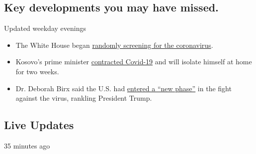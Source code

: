 \hypertarget{key-developments-you-may-have-missed}{%
\subsection{Key developments you may have
missed.}\label{key-developments-you-may-have-missed}}

Updated weekday evenings

\begin{itemize}
\tightlist
\item
  The White House began
  \href{https://www.nytimes.com/2020/08/03/world/coronavirus-covid-19.html\#link-c4a1d71}{randomly
  screening for the coronavirus}.
\item
  Kosovo's prime minister
  \href{https://nl.nytimes.com/f/a/umYjgHqFQS0DWGLnViksGQ~~/AAAAAQA~/RgRhCxH_P4QgAWh0dHBzOi8vd3d3LnJldXRlcnMuY29tL2FydGljbGUvdXMtaGVhbHRoLWNvcm9uYXZpcnVzLWtvc292by1wcmltZW1pbmlzdC9rb3Nvdm8tcHJpbWUtbWluaXN0ZXItc2F5cy1oZS1oYXMtY292aWQtMTktaWRVU0tCTjI0WTBPTj9jYW1wYWlnbl9pZD0xNTQmZW1jPWVkaXRfY2JfMjAyMDA4MDMmaW5zdGFuY2VfaWQ9MjA5NDQmbmw9Y29yb25hdmlydXMtYnJpZWZpbmcmcmVnaV9pZD0zNTQ2NDU0MSZzZWdtZW50X2lkPTM1MTI5JnRlPTEmdXNlcl9pZD02Njg0MjBkMWQ1MGVjZTM5ZTdlNGNkYmRkYzAxOTZkMFcDbnl0QgoAMv-MKF_UfRy_UhhrYXJlbi5iYXJyb3dAbnl0aW1lcy5jb21YBAAAAAA~}{contracted
  Covid-19} and will isolate himself at home for two weeks.
\item
  Dr. Deborah Birx said the U.S. had
  \href{https://www.nytimes.com/2020/08/03/world/coronavirus-covid-19.html}{entered
  a ``new phase''} in the fight against the virus, rankling President
  Trump.
\end{itemize}

\hypertarget{live-updates}{%
\subsection{Live Updates}\label{live-updates}}

35 minutes ago


